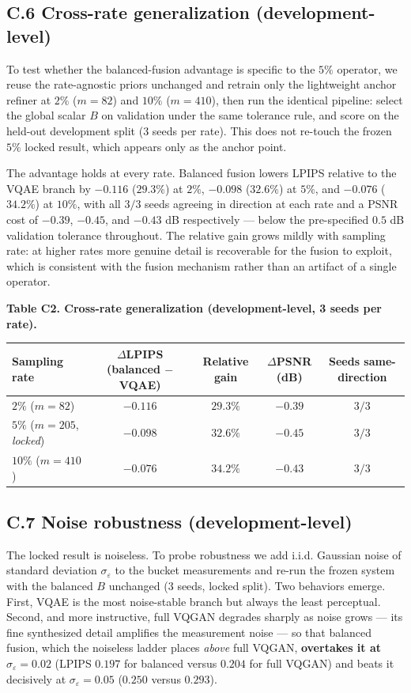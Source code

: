 \documentclass[11pt]{article}
\begin{document}
\subsection*{C.6 Cross-rate generalization (development-level)}

To test whether the balanced-fusion advantage is specific to the $5\%$ operator, we reuse the rate-agnostic priors unchanged and retrain only the lightweight anchor refiner at $2\%$ ($m=82$) and $10\%$ ($m=410$), then run the identical pipeline: select the global scalar $B$ on validation under the same tolerance rule, and score on the held-out development split (3 seeds per rate). This does not re-touch the frozen $5\%$ locked result, which appears only as the anchor point.

The advantage holds at every rate. Balanced fusion lowers LPIPS relative to the VQAE branch by $-0.116$ ($29.3\%$) at $2\%$, $-0.098$ ($32.6\%$) at $5\%$, and $-0.076$ ($34.2\%$) at $10\%$, with all $3/3$ seeds agreeing in direction at each rate and a PSNR cost of $-0.39$, $-0.45$, and $-0.43$ dB respectively --- below the pre-specified $0.5$ dB validation tolerance throughout. The relative gain grows mildly with sampling rate: at higher rates more genuine detail is recoverable for the fusion to exploit, which is consistent with the fusion mechanism rather than an artifact of a single operator.

\textbf{Table C2. Cross-rate generalization (development-level, 3 seeds per rate).}

\begin{center}\begin{tabular}{lcccc}
\toprule
Sampling rate & $\Delta$LPIPS (balanced $-$ VQAE) & Relative gain & $\Delta$PSNR (dB) & Seeds same-direction \\
\midrule
$2\%$ ($m=82$) & $-0.116$ & $29.3\%$ & $-0.39$ & $3/3$ \\
$5\%$ ($m=205$, \textit{locked}) & $-0.098$ & $32.6\%$ & $-0.45$ & $3/3$ \\
$10\%$ ($m=410$) & $-0.076$ & $34.2\%$ & $-0.43$ & $3/3$ \\
\bottomrule
\end{tabular}\end{center}


\subsection*{C.7 Noise robustness (development-level)}

The locked result is noiseless. To probe robustness we add i.i.d. Gaussian noise of standard deviation $\sigma_\varepsilon$ to the bucket measurements and re-run the frozen system with the balanced $B$ unchanged (3 seeds, locked split). Two behaviors emerge. First, VQAE is the most noise-stable branch but always the least perceptual. Second, and more instructive, full VQGAN degrades sharply as noise grows --- its fine synthesized detail amplifies the measurement noise --- so that balanced fusion, which the noiseless ladder places \textit{above} full VQGAN, \textbf{overtakes it at $\sigma_\varepsilon = 0.02$} (LPIPS $0.197$ for balanced versus $0.204$ for full VQGAN) and beats it decisively at $\sigma_\varepsilon = 0.05$ ($0.250$ versus $0.293$).
\end{document}
